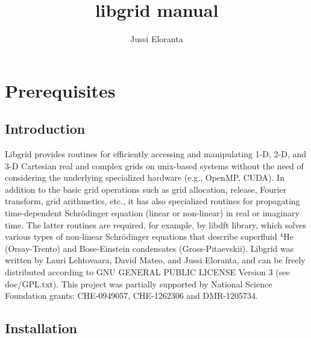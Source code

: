 \documentclass[12pt,letterpaper]{report}
\author{Jussi Eloranta}
\title{libgrid manual}
\begin{document}
\maketitle

\chapter{Prerequisites}

\section{Introduction}

Libgrid provides routines for efficiently accessing and manipulating 1-D, 2-D, and 3-D Cartesian real and complex grids on unix-based systems without the need of considering the underlying specialized hardware (e.g., OpenMP, CUDA). In addition to the basic grid operations such as grid allocation, release, Fourier transform, grid arithmetics, etc., it has also specialized routines for propagating time-dependent Schr\"odinger equation (linear or non-linear) in real or imaginary time. The latter routines are required, for example, by libdft library, which solves various types of non-linear Schr\"odinger equations that describe superfluid $^4$He (Orsay-Trento) and Bose-Einstein condensates (Gross-Pitaevskii). Libgrid was written by Lauri Lehtovaara, David Mateo, and Jussi Eloranta, and can be freely distributed according to GNU GENERAL PUBLIC LICENSE Version 3 (see doc/GPL.txt). This project was partially supported by National Science Foundation grants: CHE-0949057, CHE-1262306 and DMR-1205734.

\section{Installation}
\end{document}
